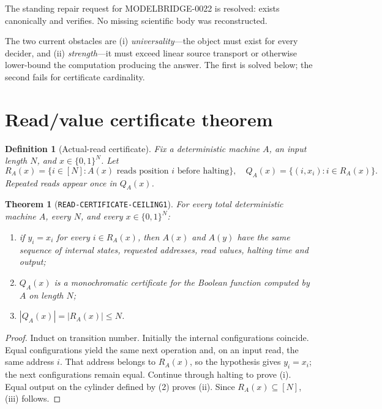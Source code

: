 \documentclass[11pt]{article}
\newtheorem{theorem}{Theorem}
\newtheorem{definition}{Definition}
\begin{document}
The standing repair request for MODELBRIDGE-0022 is resolved:
exists canonically and verifies.  No missing scientific body was reconstructed.

The two current obstacles are (i) \emph{universality}---the object must exist
for every decider, and (ii) \emph{strength}---it must exceed linear source
transport or otherwise lower-bound the computation producing the answer.  The
first is solved below; the second fails for certificate cardinality.

\section{Read/value certificate theorem}
\begin{definition}[Actual-read certificate]
Fix a deterministic machine \(A\), an input length \(N\), and
\(x\in\{0,1\}^N\).  Let
\[
 R_A(x)=\{i\in[N]:A(x)\text{ reads position }i\text{ before halting}\},
\quad
 Q_A(x)=\{(i,x_i):i\in R_A(x)\}.                            \tag{2}
\]
Repeated reads appear once in \(Q_A(x)\).
\end{definition}

\begin{theorem}[\texttt{READ-CERTIFICATE-CEILING1}]
For every total deterministic machine \(A\), every \(N\), and every
\(x\in\{0,1\}^N\):
\begin{enumerate}[label=(\roman*),leftmargin=1.7em]
\item if \(y_i=x_i\) for every \(i\in R_A(x)\), then \(A(x)\) and \(A(y)\)
have the same sequence of internal states, requested addresses, read values,
halting time and output;
\item \(Q_A(x)\) is a monochromatic certificate for the Boolean function
computed by \(A\) on length \(N\);
\item \(|Q_A(x)|=|R_A(x)|\le N\).
\end{enumerate}
\end{theorem}

\begin{proof}
Induct on transition number.  Initially the internal configurations coincide.
Equal configurations yield the same next operation and, on an input read, the
same address \(i\).  That address belongs to \(R_A(x)\), so the hypothesis
gives \(y_i=x_i\); the next configurations remain equal.  Continue through
halting to prove (i).  Equal output on the cylinder defined by (2) proves (ii).
Since \(R_A(x)\subseteq[N]\), (iii) follows.
\end{proof}
\end{document}
